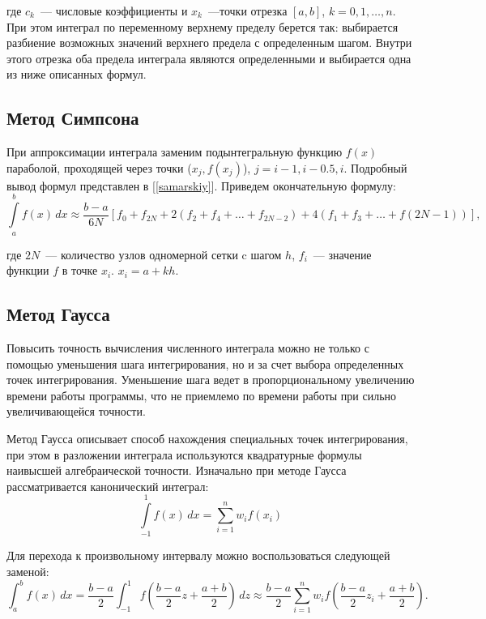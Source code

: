 где $c_k$~--- числовые коэффициенты и $x_k$~---точки отрезка $[a,b]$, $k=0, 1, \ldots, n$.
При этом интеграл по переменному верхнему пределу берется так: выбирается разбиение возможных значений верхнего предела
с определенным шагом. Внутри этого отрезка оба предела интеграла являются определенными и выбирается одна из ниже описанных формул.

\subsection{Метод Симпсона\label{simpson}}
При аппроксимации интеграла заменим подынтегральную функцию $f(x)$ параболой, проходящей через точки
($x_j, f(x_j) $), $j=i-1, i-0.5, i$. Подробный вывод формул представлен в [\ref{samarskiy}]. Приведем окончательную формулу:
\begin{equation}
\int\limits^b_a f(x)\,dx \approx \dfrac{b-a}{6N}\left[f_0 +f_{2N}+2(f_2+f_4+\ldots+f_{2N-2})+4(f_1+f_3+\ldots+f(2N-1))\right],
\end{equation}

где $2N$~--- количество узлов одномерной сетки c шагом $h$, $f_i$~--- значение функции $f$ в точке $x_i$. $x_i = a+kh$.

\subsection{Метод Гаусса\label{gauss}}
Повысить точность вычисления численного интеграла можно не только с помощью уменьшения шага интегрирования, но и за счет 
выбора определенных точек интегрирования. Уменьшение шага ведет в пропорциональному увеличению времени работы программы, что не
приемлемо по времени работы при сильно увеличивающейся точности.

Метод Гаусса описывает способ нахождения специальных точек интегрирования, при этом в разложении интеграла используются квадратурные
формулы наивысшей алгебраической точности.
Изначально при методе Гаусса рассматривается канонический интеграл:
\begin{equation}
\int\limits_{-1}^1 f(x)\, dx = \sum\limits_{i=1}^n w_i f(x_i)
\end{equation}

Для перехода к произвольному интервалу можно воспользоваться следующей заменой:
\begin{equation}
\int_a^b f(x)\,dx = \frac{b-a}{2} \int_{-1}^1 f\left(\frac{b-a}{2}z 
+ \frac{a+b}{2}\right)\,dz \approx \frac{b-a}{2} \sum_{i=1}^n w_i f\left(\frac{b-a}{2}z_i + \frac{a+b}{2}\right).
\end{equation}

